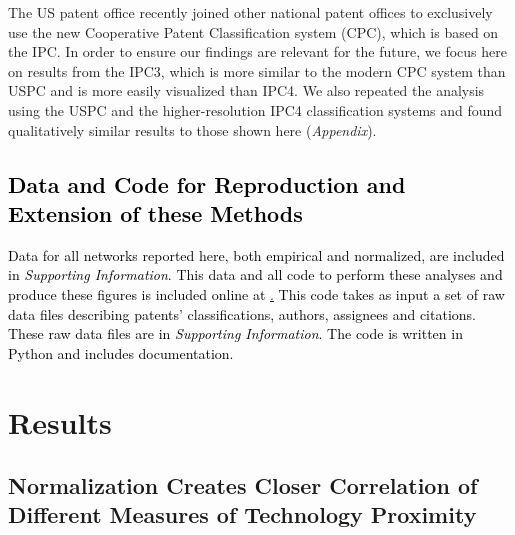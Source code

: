 \documentclass[]{svjour3}
\begin{document}
The US patent office recently joined other national patent offices to exclusively use the new Cooperative Patent Classification system (CPC), which is based on the IPC. In order to ensure our findings are relevant for the future, we focus here on results from the IPC3, which is more similar to the modern CPC system than USPC and is more easily visualized than IPC4. We also repeated the analysis using the USPC and the higher-resolution IPC4 classification systems and found qualitatively similar results to those shown here (\textit{Appendix}).

\textcolor{black}{\subsection{Data and Code for Reproduction and Extension of these Methods}
Data for all networks reported here, both empirical and normalized, are included in \textit{Supporting Information}. This data and all code to perform these analyses and produce these figures is included online at \href{https://www.github.com/jeffalstott/technologyspace}. This code takes as input a set of raw data files describing patents' classifications, authors, assignees and citations. These raw data files are in \textit{Supporting Information}. The code is written in Python and includes documentation.}

\section{Results}

\subsection{Normalization Creates Closer Correlation of Different Measures of Technology Proximity}
\end{document}
